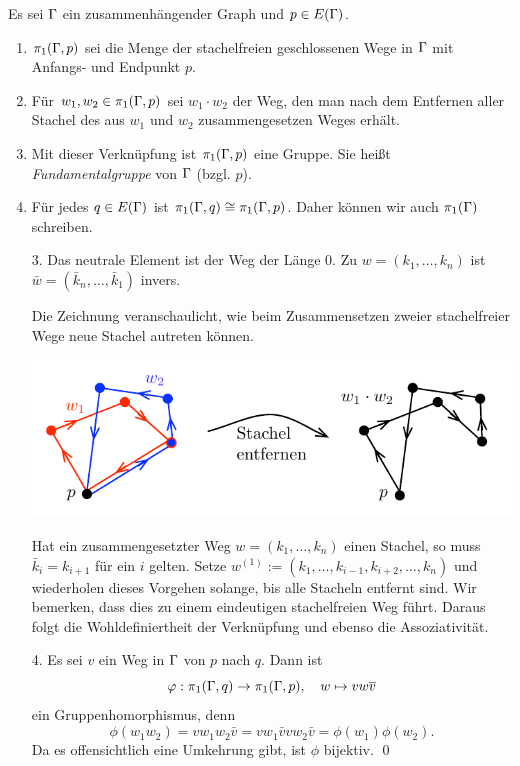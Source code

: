 \documentclass[a4paper, 12pt, twoside]{article}
\begin{document}
\DB Es sei $\Gamma$ ein zusammenhängender Graph und $p\in E(\Gamma)$.
\begin{enumerate}
\item $\pi_1(\Gamma,p)$ sei die Menge der stachelfreien geschlossenen
Wege in $\Gamma$ mit Anfangs- und Endpunkt $p$.
\item Für $w_1, w_2\in \pi_1(\Gamma,p)$ sei $w_1\cdot w_2$ der
Weg, den man nach dem Entfernen aller Stachel des aus $w_1$ und $w_2$
zusammengesetzen Weges erhält.
\item Mit dieser Verknüpfung ist $\pi_1(\Gamma,p)$ eine Gruppe.
Sie heißt \emph{Fundamentalgruppe}
von $\Gamma$ (bzgl. $p$).
\item Für jedes $q\in E(\Gamma)$ ist $\pi_1(\Gamma,q)\cong\pi_1(\Gamma,p)$.
Daher können wir auch $\pi_1(\Gamma)$ schreiben.
\end{enumerate}
\bew
\begin{itemize}
\item[3.] Das neutrale Element ist der Weg der Länge $0$.
Zu $w=(k_1,\ldots,k_n)$ ist
$\bar{w}=(\bar{k}_n,\ldots,\bar{k}_1)$ invers.

Die Zeichnung veranschaulicht, wie beim Zusammensetzen zweier
stachelfreier Wege neue Stachel autreten können.
\begin{center}
	\includegraphics{grugraImages/w1w2}
\end{center}
Hat ein zusammengesetzter Weg $w=(k_1,\ldots,k_n)$ einen Stachel,
so muss $\bar{k}_i=k_{i+1}$ für ein $i$ gelten.
Setze $w^{(1)}:=(k_1,\ldots,k_{i-1},k_{i+2},\ldots,k_n)$ und
wiederholen dieses Vorgehen solange, bis alle Stacheln entfernt sind.
Wir bemerken, dass dies zu einem eindeutigen stachelfreien Weg führt.
Daraus folgt die Wohldefiniertheit der Verknüpfung und ebenso die
Assoziativität.
\item[4.] Es sei $v$ ein Weg in $\Gamma$ von $p$ nach $q$. Dann ist
\[
\varphi:\pi_1(\Gamma,q)\rightarrow\pi_1(\Gamma,p),\quad
w\mapsto vw\overline{v}
\]
ein Gruppenhomorphismus, denn
\[
\phi(w_1 w_2) = v w_1 w_2 \bar{v}
=v w_1 \bar{v} v w_2 \bar{v}
=\phi(w_1)\phi(w_2).
\]
Da es offensichtlich eine Umkehrung gibt, ist $\phi$ bijektiv.
\qed
\end{itemize}
\end{document}
